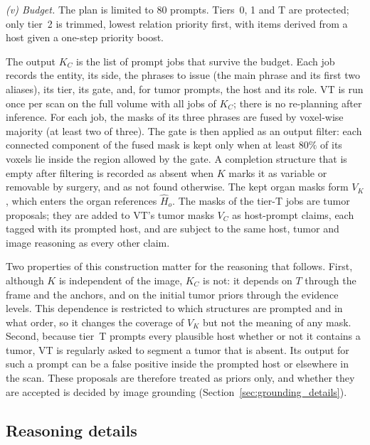 \documentclass[fleqn,10pt]{olplainarticle}
\begin{document}
\emph{(v) Budget.} The plan is limited to $80$ prompts. Tiers~0, 1 and T are protected; only tier~2 is trimmed, lowest relation
priority first, with items derived from a host given a one-step priority boost.

The output $K_C$ is the list of prompt jobs that survive the budget. Each job records the entity, its side, the phrases to
issue (the main phrase and its first two aliases), its tier, its gate, and, for tumor prompts, the host and its
role. VT is run once per scan on the full volume with all jobs of $K_C$; there is no re-planning after inference.
For each job, the masks of its three phrases are fused by voxel-wise majority (at least two of three). The gate is then
applied as an output filter: each connected component of the fused mask is kept only when at least $80\%$ of its
voxels lie inside the region allowed by the gate. A completion structure that is empty after filtering is recorded as
absent when $K$ marks it as variable or removable by surgery, and as not found otherwise. The kept organ masks form $V_K$, which enters the organ references
$\hat H_o$. The masks of the tier-T jobs are tumor proposals; they are added to VT's tumor masks $V_C$ as host-prompt
claims, each tagged with its prompted host, and are subject to the same host, tumor and image reasoning as every other claim.

Two properties of this construction matter for the reasoning that follows. First, although $K$ is independent of the
image, $K_C$ is not: it depends on $T$ through the frame and the anchors, and on the initial tumor priors through the
evidence levels. This dependence is restricted to which structures are prompted and in what order, so it changes the
coverage of $V_K$ but not the meaning of any mask. Second, because tier~T prompts every plausible host whether or not it
contains a tumor, VT is regularly asked to segment a tumor that is absent. Its output for such a prompt can be a false
positive inside the prompted host or elsewhere in the scan. These proposals are therefore treated as priors only, and
whether they are accepted is decided by image grounding
(Section~\ref{sec:grounding_details}).

\subsection{Reasoning details}
\label{sec:reasoning_details}
\end{document}
